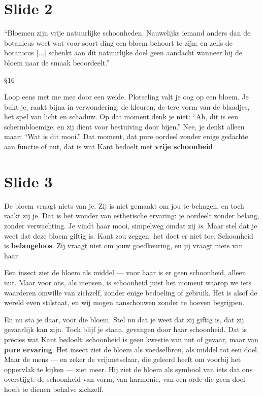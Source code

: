 \documentclass{article}
\begin{document}
\newpage

\section*{Slide 2}

\epigraph{``Bloemen zijn vrije natuurlijke schoonheden. Nauwelijks iemand anders dan de botanicus weet wat voor soort ding een bloem behoort te zijn; en zelfs de botanicus [...] schenkt aan dit natuurlijke doel geen aandacht wanneer hij de bloem naar de smaak beoordeelt.''}{§16}

Loop eens met me mee door een weide. Plotseling valt je oog op een bloem. Je bukt je, raakt bijna in verwondering: de kleuren, de tere vorm van de blaadjes, het spel van licht en schaduw. Op dat moment denk je niet: ``Ah, dit is een schermbloemige, en zij dient voor bestuiving door bijen.'' Nee, je denkt alleen maar: ``Wat is dit mooi.'' Dat moment, dat pure oordeel zonder enige gedachte aan functie of nut, dat is wat Kant bedoelt met \textbf{vrije schoonheid}.

\section*{Slide 3}

De bloem vraagt niets van je. Zij is niet gemaakt om jou te behagen, en toch raakt zij je. Dat is het wonder van esthetische ervaring: je oordeelt zonder belang, zonder verwachting. Je vindt haar mooi, simpelweg omdat zij \textit{is}. Maar stel dat je weet dat deze bloem giftig is. Kant zou zeggen: het doet er niet toe. Schoonheid is \textbf{belangeloos}. Zij vraagt niet om jouw goedkeuring, en jij vraagt niets van haar.

Een insect ziet de bloem als middel — voor haar is er geen schoonheid, alleen nut. Maar voor ons, als mensen, is schoonheid juist het moment waarop we iets waarderen omwille van zichzelf, zonder enige bedoeling of gebruik. Het is alsof de wereld even stilstaat, en wij mogen aanschouwen zonder te hoeven begrijpen.

En nu sta je daar, voor die bloem. Stel nu dat je weet dat zij giftig is, dat zij gevaarlijk kan zijn. Toch blijf je staan, gevangen door haar schoonheid. Dat is precies wat Kant bedoelt: schoonheid is geen kwestie van nut of gevaar, maar van \textbf{pure ervaring}. Het insect ziet de bloem als voedselbron, als middel tot een doel. Maar de mens — en zeker de vrijmetselaar, die geleerd heeft om voorbij het oppervlak te kijken — ziet meer. Hij ziet de bloem als symbool van iets dat ons overstijgt: de schoonheid van vorm, van harmonie, van een orde die geen doel hoeft te dienen behalve zichzelf.
\end{document}
